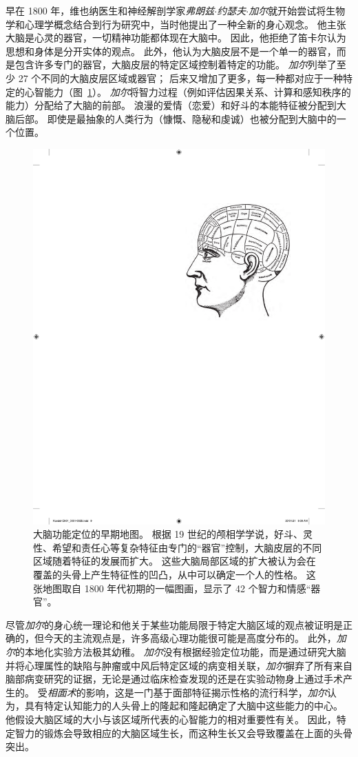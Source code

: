 早在 1800 年，维也纳医生和神经解剖学家\textit{弗朗兹$\cdot$约瑟夫$\cdot$加尔}就开始尝试将生物学和心理学概念结合到行为研究中，当时他提出了一种全新的身心观念。
他主张大脑是心灵的器官，一切精神功能都体现在大脑中。
因此，他拒绝了笛卡尔认为思想和身体是分开实体的观点。
此外，他认为大脑皮层不是一个单一的器官，而是包含许多专门的器官，大脑皮层的特定区域控制着特定的功能。 
\textit{加尔}列举了至少 27 个不同的大脑皮层区域或器官； 后来又增加了更多，每一种都对应于一种特定的心智能力（图~\ref{fig:1_1}）。
\textit{加尔}将智力过程（例如评估因果关系、计算和感知秩序的能力）分配给了大脑的前部。
浪漫的爱情（恋爱）和好斗的本能特征被分配到大脑后部。
即使是最抽象的人类行为（慷慨、隐秘和虔诚）也被分配到大脑中的一个位置。


\begin{figure}[htbp]
	\centering
	\includegraphics[width=0.55\linewidth]{chap01/fig_1_1}
	\caption{大脑功能定位的早期地图。
		根据 19 世纪的颅相学学说，好斗、灵性、希望和责任心等复杂特征由专门的“器官”控制，大脑皮层的不同区域随着特征的发展而扩大。
		这些大脑局部区域的扩大被认为会在覆盖的头骨上产生特征性的凹凸，从中可以确定一个人的性格。
		这张地图取自 1800 年代初期的一幅图画，显示了 42 个智力和情感“器官”。}
	\label{fig:1_1}
\end{figure}


尽管\textit{加尔}的身心统一理论和他关于某些功能局限于特定大脑区域的观点被证明是正确的，但今天的主流观点是，许多高级心理功能很可能是高度分布的。
此外，\textit{加尔}的本地化实验方法极其幼稚。
\textit{加尔}没有根据经验定位功能，而是通过研究大脑并将心理属性的缺陷与肿瘤或中风后特定区域的病变相关联，\textit{加尔}摒弃了所有来自脑部病变研究的证据，无论是通过临床检查发现的还是在实验动物身上通过手术产生的。
受\textit{相面术}的影响，这是一门基于面部特征揭示性格的流行科学，\textit{加尔}认为，具有特定认知能力的人头骨上的隆起和隆起确定了大脑中这些能力的中心。
他假设大脑区域的大小与该区域所代表的心智能力的相对重要性有关。
因此，特定智力的锻炼会导致相应的大脑区域生长，而这种生长又会导致覆盖在上面的头骨突出。


